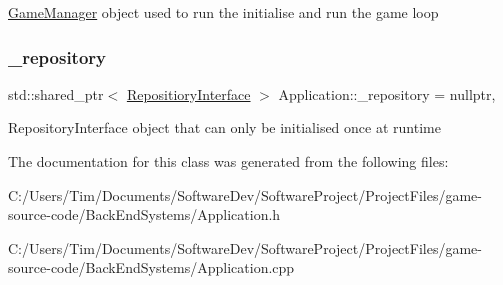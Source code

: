 \hyperlink{class_game_manager}{Game\+Manager} object used to run the initialise and run the game loop \mbox{\label{class_application_af7e1a832b2f8dbc3a283cb29f7a89c01}} 
\subsubsection{\texorpdfstring{\+\_\+repository}{\_repository}}
{\footnotesize\ttfamily std\+::shared\+\_\+ptr$<$ \hyperlink{class_repositiory_interface}{Repositiory\+Interface} $>$ Application\+::\+\_\+repository = nullptr\hspace{0.3cm}{\ttfamily [static]}, {\ttfamily [private]}}

Repository\+Interface object that can only be initialised once at runtime 

The documentation for this class was generated from the following files\+:\begin{DoxyCompactItemize}
\item 
C\+:/\+Users/\+Tim/\+Documents/\+Software\+Dev/\+Software\+Project/\+Project\+Files/game-\/source-\/code/\+Back\+End\+Systems/Application.\+h\item 
C\+:/\+Users/\+Tim/\+Documents/\+Software\+Dev/\+Software\+Project/\+Project\+Files/game-\/source-\/code/\+Back\+End\+Systems/Application.\+cpp\end{DoxyCompactItemize}
